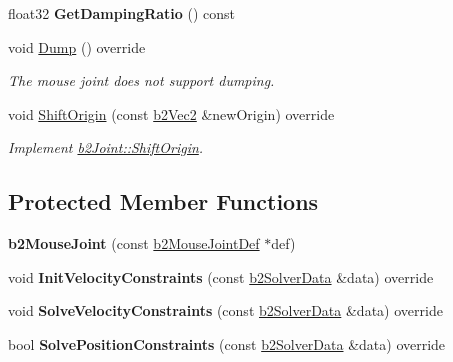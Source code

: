 \begin{DoxyCompactItemize}
\mbox{\label{classb2MouseJoint_a551de1d56a743e71684a1382054c17c9}} 
float32 {\bfseries Get\+Damping\+Ratio} () const
\item 
\mbox{\label{classb2MouseJoint_aea1ff1e5b71ba5630875585cab1e2a96}} 
void \mbox{\hyperlink{classb2MouseJoint_aea1ff1e5b71ba5630875585cab1e2a96}{Dump}} () override
\begin{DoxyCompactList}\small\item\em The mouse joint does not support dumping. \end{DoxyCompactList}\item 
\mbox{\label{classb2MouseJoint_a9b1b2671837495be175e496afb622904}} 
void \mbox{\hyperlink{classb2MouseJoint_a9b1b2671837495be175e496afb622904}{Shift\+Origin}} (const \mbox{\hyperlink{structb2Vec2}{b2\+Vec2}} \&new\+Origin) override
\begin{DoxyCompactList}\small\item\em Implement \mbox{\hyperlink{classb2Joint_a7804f649e993dc0fd9ae47fde5601f90}{b2\+Joint\+::\+Shift\+Origin}}. \end{DoxyCompactList}\end{DoxyCompactItemize}
\subsection*{Protected Member Functions}
\begin{DoxyCompactItemize}
\item 
\mbox{\label{classb2MouseJoint_ad147d7989d884952c3389f7e5e3acf68}} 
{\bfseries b2\+Mouse\+Joint} (const \mbox{\hyperlink{structb2MouseJointDef}{b2\+Mouse\+Joint\+Def}} $\ast$def)
\item 
\mbox{\label{classb2MouseJoint_a02c342a98cfa5687de2bd3dba7c700b1}} 
void {\bfseries Init\+Velocity\+Constraints} (const \mbox{\hyperlink{structb2SolverData}{b2\+Solver\+Data}} \&data) override
\item 
\mbox{\label{classb2MouseJoint_a9256297320a1a67e9dc49b70f4798dd8}} 
void {\bfseries Solve\+Velocity\+Constraints} (const \mbox{\hyperlink{structb2SolverData}{b2\+Solver\+Data}} \&data) override
\item 
\mbox{\label{classb2MouseJoint_a13f9ec996eff59c15e6330a8c3f5ba9f}} 
bool {\bfseries Solve\+Position\+Constraints} (const \mbox{\hyperlink{structb2SolverData}{b2\+Solver\+Data}} \&data) override
\end{DoxyCompactItemize}
